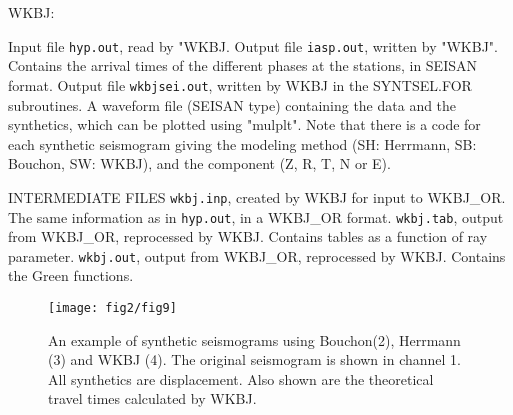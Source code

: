 WKBJ: 

Input file \texttt{hyp.out}, read by "WKBJ. \newline
Output file \texttt{iasp.out}, written by "WKBJ". Contains the arrival times of \newline
the different phases at the stations, in SEISAN format. \newline
Output file \texttt{wkbjsei.out}, written by WKBJ in the SYNTSEL.FOR subroutines. A waveform file (SEISAN type) containing the data and the synthetics, which can be plotted using "mulplt". Note that there is a code for each synthetic seismogram giving the modeling method (SH: Herrmann, SB: Bouchon, SW: WKBJ), and the component (Z, R, T, N or E). 

INTERMEDIATE FILES \newline
\texttt{wkbj.inp}, created by WKBJ for input to WKBJ\_OR. The same information as 
in \texttt{hyp.out}, in a WKBJ\_OR format. \newline
\texttt{wkbj.tab}, output from WKBJ\_OR, reprocessed by WKBJ. 
Contains tables as a function of ray parameter. \newline
\texttt{wkbj.out}, output from WKBJ\_OR, reprocessed by WKBJ. Contains the Green functions. 

\begin{figure}
\centerline{\texttt{[image: fig2/fig9]}}
\caption{
An example of synthetic seismograms using Bouchon(2),  Herrmann (3) and WKBJ (4). The original seismogram is shown in channel 1. All synthetics are displacement. Also shown are the theoretical travel times calculated by WKBJ. 
}
\label{fig:synthetic}
\end{figure}


